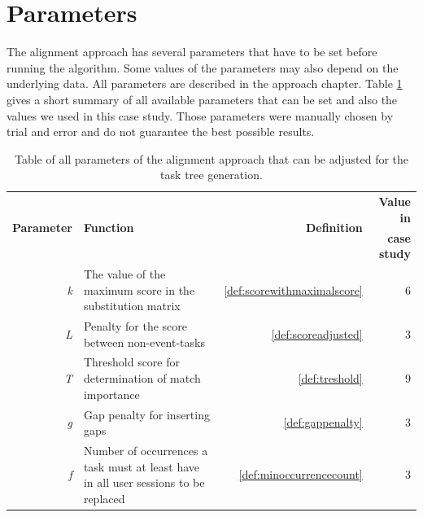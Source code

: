 \section{Parameters}
The alignment approach has several parameters that have to be set before running the algorithm. Some values of the parameters may also depend on the underlying data.
All parameters are described in the approach chapter. Table \ref{tab:parameters} gives a short summary of all available parameters that can be set and also the values
we used in this case study. Those parameters were manually chosen by trial and error and do not guarantee the best possible results.

\begin{table}[h!]
	\begin{tabularx}{\textwidth}{ r X r r}
	   \toprule
		\multirow{2}{*}{\textbf{Parameter}} & \multirow{2}{*}{\textbf{Function}} & \multirow{2}{*}{\textbf{Definition}} & \textbf{Value in} \\
		& & &\textbf{case study}\\
	     \midrule
	       \emph{k} & The value of the maximum score in the substitution matrix& \ref{def:scorewithmaximalscore}& 6  \\
			 \noalign{\medskip}
	       \emph{L} & Penalty for the score between non-event-tasks & \ref{def:scoreadjusted} & 3 \\
	      \noalign{\medskip}
			 \emph{T} & Threshold score for determination of match importance & \ref{def:treshold} & 9\\
	      \noalign{\medskip}
			\emph{g} & Gap penalty for inserting gaps & \ref{def:gappenalty} & 3 \\
	      \noalign{\medskip}
			 \emph{f} & Number of occurrences a task must at least have in all user sessions to be replaced & \ref{def:minoccurrencecount} &3\\
	       \bottomrule
 \end{tabularx}
 \caption{Table of all parameters of the alignment approach that can be adjusted for the task tree generation.}
 \label{tab:parameters}
 \end{table}


